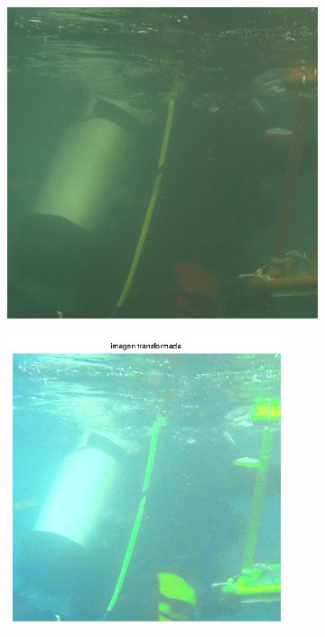 \documentclass{article}
\begin{document}
\begin{figure}[H]
	\begin{subfigure}{0.5\textwidth}
	\centering
        \includegraphics[scale=0.5]{1908xx.png}
    \end{subfigure}\hfill
	\begin{subfigure}{0.5\textwidth}
	\centering
        \includegraphics[width=0.9\textwidth]{1923-transformada-40-2x-2x.png}
    \end{subfigure}\hfill
\end{figure}\hfill
\end{document}
